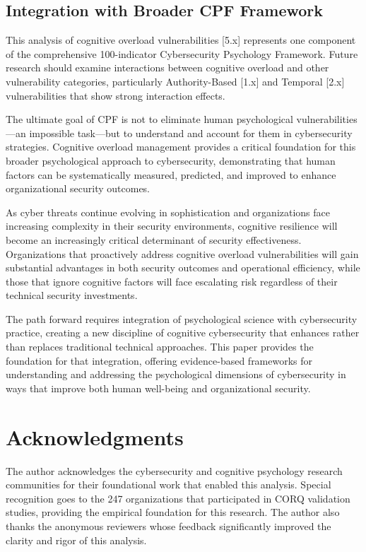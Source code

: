 \documentclass[11pt,a4paper]{article}
\begin{document}
\subsection{Integration with Broader CPF Framework}

This analysis of cognitive overload vulnerabilities [5.x] represents one component of the comprehensive 100-indicator Cybersecurity Psychology Framework. Future research should examine interactions between cognitive overload and other vulnerability categories, particularly Authority-Based [1.x] and Temporal [2.x] vulnerabilities that show strong interaction effects.

The ultimate goal of CPF is not to eliminate human psychological vulnerabilities—an impossible task—but to understand and account for them in cybersecurity strategies. Cognitive overload management provides a critical foundation for this broader psychological approach to cybersecurity, demonstrating that human factors can be systematically measured, predicted, and improved to enhance organizational security outcomes.

As cyber threats continue evolving in sophistication and organizations face increasing complexity in their security environments, cognitive resilience will become an increasingly critical determinant of security effectiveness. Organizations that proactively address cognitive overload vulnerabilities will gain substantial advantages in both security outcomes and operational efficiency, while those that ignore cognitive factors will face escalating risk regardless of their technical security investments.

The path forward requires integration of psychological science with cybersecurity practice, creating a new discipline of cognitive cybersecurity that enhances rather than replaces traditional technical approaches. This paper provides the foundation for that integration, offering evidence-based frameworks for understanding and addressing the psychological dimensions of cybersecurity in ways that improve both human well-being and organizational security.

\section*{Acknowledgments}

The author acknowledges the cybersecurity and cognitive psychology research communities for their foundational work that enabled this analysis. Special recognition goes to the 247 organizations that participated in CORQ validation studies, providing the empirical foundation for this research. The author also thanks the anonymous reviewers whose feedback significantly improved the clarity and rigor of this analysis.
\end{document}
